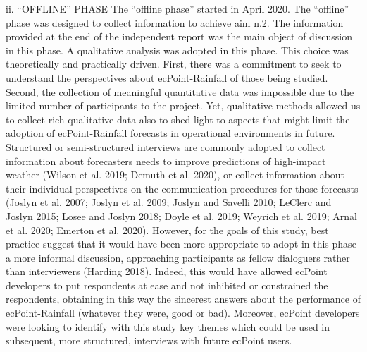 \documentclass[twocol]{ametsocV5} %
\begin{document}
ii.	“OFFLINE” PHASE
The “offline phase” started in April 2020. 
The “offline” phase was designed to collect information to achieve aim n.2. The information provided at the end of the independent report was the main object of discussion in this phase. A qualitative analysis was adopted in this phase. This choice was theoretically and practically driven. First, there was a commitment to seek to understand the perspectives about ecPoint-Rainfall of those being studied. Second, the collection of meaningful quantitative data was impossible due to the limited number of participants to the project. Yet, qualitative methods allowed us to collect rich qualitative data also to shed light to aspects that might limit the adoption of ecPoint-Rainfall forecasts in operational environments in future.
Structured or semi-structured interviews are commonly adopted to collect information about forecasters needs to improve predictions of high-impact weather (Wilson et al. 2019; Demuth et al. 2020), or collect information about their individual perspectives on the communication procedures for those forecasts (Joslyn et al. 2007; Joslyn et al. 2009; Joslyn and Savelli 2010; LeClerc and Joslyn 2015; Losee and Joslyn 2018; Doyle et al. 2019; Weyrich et al. 2019; Arnal et al. 2020; Emerton et al. 2020). However, for the goals of this study, best practice suggest that it would have been more appropriate to adopt in this phase a more informal discussion, approaching participants as fellow dialoguers rather than interviewers (Harding 2018). Indeed, this would have allowed ecPoint developers to put respondents at ease and not inhibited or constrained the respondents, obtaining in this way the sincerest answers about the performance of ecPoint-Rainfall (whatever they were, good or bad). Moreover, ecPoint developers were looking to identify with this study key themes which could be used in subsequent, more structured, interviews with future ecPoint users. 
\end{document}
